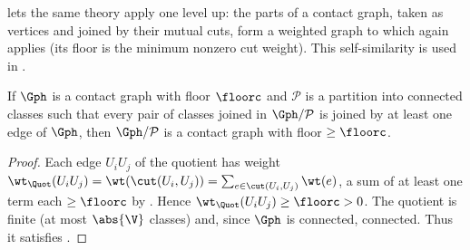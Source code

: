 \begin{remark}
\label{rem:quotient}
 lets the same theory apply one level up: the parts of a
contact graph, taken as vertices and joined by their mutual cuts, form a
weighted graph to which  again applies (its floor is the
minimum nonzero cut weight). This self-similarity is used in
.
\end{remark}

\begin{lemma}
\label{lem:quotient-floor}
If $\Gph$ is a contact graph with floor $\floorc$ and $\mathcal{P}$ is a
partition into connected classes such that every pair of classes joined in
$\Gph/\mathcal{P}$ is joined by at least one edge of $\Gph$, then
$\Gph/\mathcal{P}$ is a contact graph with floor $\ge\floorc$.
\end{lemma}

\begin{proof}
Each edge $U_iU_j$ of the quotient has weight
$\wt_{\Quot}(U_iU_j)=\wt(\cut(U_i,U_j))=\sum_{e\in\cut(U_i,U_j)}\wt(e)$, a sum of
at least one term each $\ge\floorc$ by . Hence
$\wt_{\Quot}(U_iU_j)\ge\floorc>0$. The quotient is finite (at most $\abs{\V}$
classes) and, since $\Gph$ is connected, connected. Thus it satisfies
.
\end{proof}
